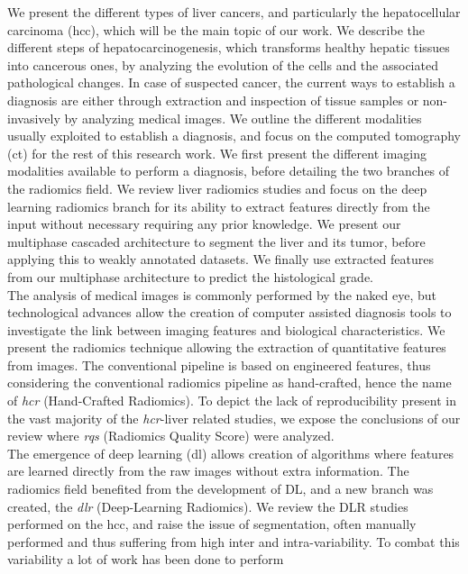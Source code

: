 We present the different types of liver cancers, and particularly the
hepatocellular carcinoma (\ac{hcc}), which will be the main topic of our work.
We describe the different steps of hepatocarcinogenesis, which
transforms healthy hepatic tissues into cancerous ones, by analyzing the
evolution of the cells and the associated pathological changes. 
In case of suspected cancer, the current ways to establish a diagnosis 
are either through extraction and inspection of tissue samples or 
non-invasively by analyzing medical images.  We outline the different modalities usually exploited to establish a
diagnosis, and focus on the computed tomography (\ac{ct}) for the rest of this
research work.  We first present the different imaging modalities available to perform a
diagnosis, before detailing the two branches of the radiomics field. We
review liver radiomics studies and focus on the deep learning radiomics
branch for its ability to extract features directly from the input without 
necessary requiring any prior knowledge. We present our multiphase 
cascaded architecture to segment the liver and
its tumor, before applying this to weakly annotated datasets. We finally
use extracted features from our multiphase architecture to predict the
histological grade. \\
The analysis of medical images is commonly performed by the naked eye,
but technological advances allow the creation of computer assisted
diagnosis tools to investigate the link between imaging features 
and biological characteristics.
We present the radiomics technique allowing the extraction of
quantitative features from images. The conventional pipeline is based on 
engineered features, thus considering the conventional radiomics pipeline as
hand-crafted, hence the name of \emph{\ac{hcr}} (Hand-Crafted Radiomics).
To depict the lack of reproducibility present in the vast majority of
the \emph{\ac{hcr}}-liver related studies, we expose the conclusions of our
review where \emph{\ac{rqs}} (Radiomics Quality Score) were analyzed. \\
The emergence of deep learning (\ac{dl}) allows creation of algorithms where
features are learned directly from the raw images without extra information. 
The radiomics field benefited from the development of DL, and a new branch 
was created, the \emph{\ac{dlr}} (Deep-Learning Radiomics).
We review the DLR studies performed on the \ac{hcc}, and raise the issue of
segmentation, often manually performed and thus suffering from high
inter and intra-variability.
To combat this variability a lot of work has been done to perform
